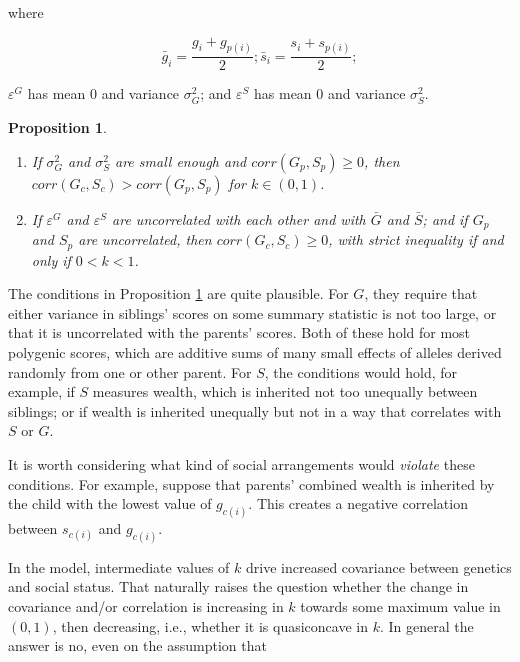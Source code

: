 \documentclass[
]{article}
\newtheorem{prop}{Proposition}
\begin{document}
where

\[
\bar{g}_{i} = \frac{g_{i} + g_{p(i)}}{2}; \bar{s}_{i} = \frac{s_{i} + s_{p(i)}}{2};
\]

\(\varepsilon^{G}\) has mean 0 and variance \(\sigma_{G}^{2}\); and
\(\varepsilon^{S}\) has mean 0 and variance \(\sigma_{S}^{2}\).

\begin{prop}
\label{prop:robustness}

\begin{enumerate}

\item If $\sigma_{G}^{2}$ and $\sigma_{S}^{2}$ are small enough and $corr(G_{p},S_{p}) \ge 0$,
then $corr(G_{c},S_{c}) > corr(G_{p},S_{p})$ for $k \in (0,1)$.

\item If $\varepsilon^{G}$ and $\varepsilon^{S}$ are uncorrelated with
each other and with $\bar{G}$ and $\bar{S}$; and if $G_{p}$ and
$S_{p}$ are uncorrelated, then $corr(G_{c},S_{c}) \ge 0$, with strict
inequality if and only if $0<k<1$.

\end{enumerate}

\end{prop}

The conditions in Proposition \ref{prop:robustness} are quite plausible.
For \(G\), they require that either variance in siblings' scores on some
summary statistic is not too large, or that it is uncorrelated with the
parents' scores. Both of these hold for most polygenic scores, which are
additive sums of many small effects of alleles derived randomly from one
or other parent. For \(S\), the conditions would hold, for example, if \(S\)
measures wealth, which is inherited not too unequally between siblings;
or if wealth is inherited unequally but not in a way that correlates
with \(S\) or \(G\).

It is worth considering what kind of social arrangements would \emph{violate}
these conditions. For example, suppose that parents' combined wealth is
inherited by the child with the lowest value of \(g_{c(i)}\). This creates
a negative correlation between \(s_{c(i)}\) and \(g_{c(i)}\).

In the model, intermediate values of \(k\) drive increased covariance
between genetics and social status. That naturally raises the question
whether the change in covariance and/or correlation is increasing in \(k\)
towards some maximum value in \((0,1)\), then decreasing, i.e., whether it
is quasiconcave in \(k\). In general the answer is no, even on the
assumption that
\end{document}

